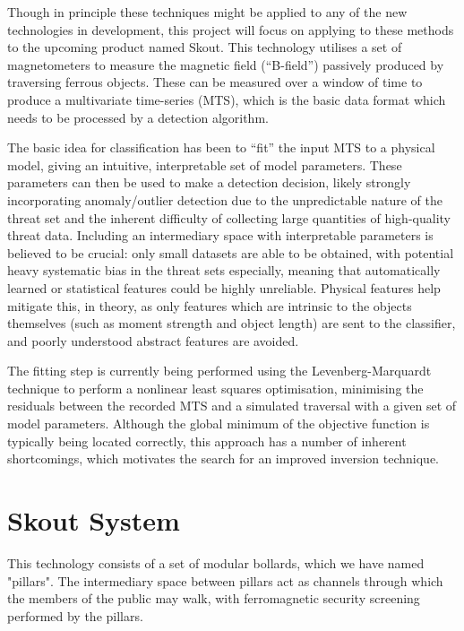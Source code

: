 \documentclass[10pt, a4paper, twocolumn]{article} %
\begin{document}
Though in principle these techniques might be applied to any of the new technologies in development, this project will focus on applying to these methods to the upcoming product named Skout. This technology utilises a set of magnetometers to measure the magnetic field (“B-field”) passively produced by traversing ferrous objects. These can be measured over a window of time to produce a multivariate time-series (MTS), which is the basic data format which needs to be processed by a detection algorithm.

The basic idea for classification has been to “fit” the input MTS to a physical model, giving an intuitive, interpretable set of model parameters. These parameters can then be used to make a detection decision, likely strongly incorporating anomaly/outlier detection due to the unpredictable nature of the threat set and the inherent difficulty of collecting large quantities of high-quality threat data. Including an intermediary space with interpretable parameters is believed to be crucial: only small datasets are able to be obtained, with potential heavy systematic bias in the threat sets especially, meaning that automatically learned or statistical features could be highly unreliable. Physical features help mitigate this, in theory, as only features which are intrinsic to the objects themselves (such as moment strength and object length) are sent to the classifier, and poorly understood abstract features are avoided.

The fitting step is currently being performed using the Levenberg-Marquardt technique to perform a nonlinear least squares optimisation, minimising the residuals between the recorded MTS and a simulated traversal with a given set of model parameters. Although the global minimum of the objective function is typically being located correctly, this approach has a number of inherent shortcomings, which motivates the search for an improved inversion technique.



\section{Skout System}

This technology consists of a set of modular bollards, which we have named "pillars". The intermediary space between pillars act as channels through which the members of the public may walk, with ferromagnetic security screening performed by the pillars.
\end{document}
